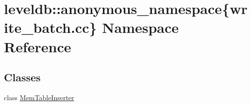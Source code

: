 \hypertarget{namespaceleveldb_1_1anonymous__namespace_02write__batch_8cc_03}{}\section{leveldb\+:\+:anonymous\+\_\+namespace\{write\+\_\+batch.\+cc\} Namespace Reference}
\label{namespaceleveldb_1_1anonymous__namespace_02write__batch_8cc_03}
\subsection*{Classes}
\begin{DoxyCompactItemize}
\item 
class \hyperlink{classleveldb_1_1anonymous__namespace_02write__batch_8cc_03_1_1_mem_table_inserter}{Mem\+Table\+Inserter}
\end{DoxyCompactItemize}
